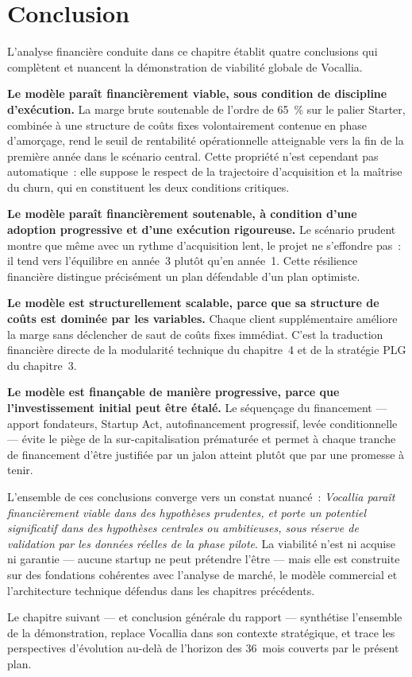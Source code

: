 \section{Conclusion}
\label{sec:conclusion_chap5}

L'analyse financière conduite dans ce chapitre établit quatre conclusions qui complètent et nuancent la démonstration de viabilité globale de Vocallia.

\textbf{Le modèle paraît financièrement viable, sous condition de discipline d'exécution.} La marge brute soutenable de l'ordre de 65~\% sur le palier Starter, combinée à une structure de coûts fixes volontairement contenue en phase d'amorçage, rend le seuil de rentabilité opérationnelle atteignable vers la fin de la première année dans le scénario central. Cette propriété n'est cependant pas automatique~: elle suppose le respect de la trajectoire d'acquisition et la maîtrise du churn, qui en constituent les deux conditions critiques.

\textbf{Le modèle paraît financièrement soutenable, à condition d'une adoption progressive et d'une exécution rigoureuse.} Le scénario prudent montre que même avec un rythme d'acquisition lent, le projet ne s'effondre pas~: il tend vers l'équilibre en année~3 plutôt qu'en année~1. Cette résilience financière distingue précisément un plan défendable d'un plan optimiste.

\textbf{Le modèle est structurellement scalable, parce que sa structure de coûts est dominée par les variables.} Chaque client supplémentaire améliore la marge sans déclencher de saut de coûts fixes immédiat. C'est la traduction financière directe de la modularité technique du chapitre~4 et de la stratégie PLG du chapitre~3.

\textbf{Le modèle est finançable de manière progressive, parce que l'investissement initial peut être étalé.} Le séquençage du financement — apport fondateurs, Startup Act, autofinancement progressif, levée conditionnelle — évite le piège de la sur-capitalisation prématurée et permet à chaque tranche de financement d'être justifiée par un jalon atteint plutôt que par une promesse à tenir.

L'ensemble de ces conclusions converge vers un constat nuancé~: \emph{Vocallia paraît financièrement viable dans des hypothèses prudentes, et porte un potentiel significatif dans des hypothèses centrales ou ambitieuses, sous réserve de validation par les données réelles de la phase pilote}. La viabilité n'est ni acquise ni garantie — aucune startup ne peut prétendre l'être — mais elle est construite sur des fondations cohérentes avec l'analyse de marché, le modèle commercial et l'architecture technique défendus dans les chapitres précédents.

Le chapitre suivant — et conclusion générale du rapport — synthétise l'ensemble de la démonstration, replace Vocallia dans son contexte stratégique, et trace les perspectives d'évolution au-delà de l'horizon des 36~mois couverts par le présent plan.